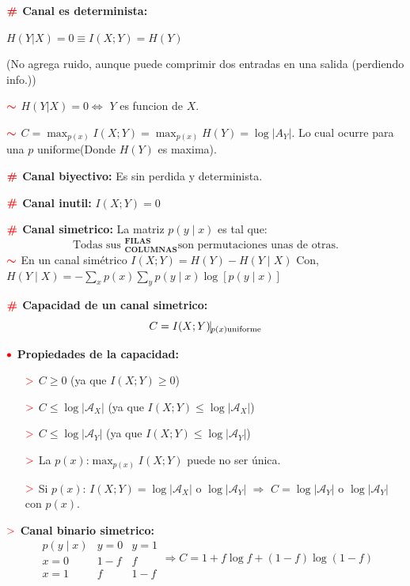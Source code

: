 \documentclass[%
 reprint,
 amsmath,amssymb,
 aps,
]{revtex4-1}
\begin{document}
\textbf{$\color{red}{\textbf{\#}}$ Canal es determinista:} 

$H(Y|X)=0 \equiv I(X;Y)=H(Y)$ 

(No agrega ruido, aunque puede comprimir dos entradas en una salida (perdiendo info.))

\textbf{$\textcolor{red}{\color{red}{\boldsymbol{\sim}}}$} 
$H(Y|X)=0 \Leftrightarrow$ $Y$ es funcion de $X$.
 
\textbf{$\textcolor{red}{\color{red}{\boldsymbol{\sim}}}$} 
$C =\operatorname{max}_{p(x)} I(X ; Y)= \operatorname{max}_{p(x)}H(Y)=\log|A_Y|$. Lo cual ocurre para una $p$ uniforme(Donde $H(Y)$ es maxima).

\textbf{$\color{red}{\textbf{\#}}$ Canal biyectivo:} 
Es sin perdida y determinista.

\textbf{$\color{red}{\textbf{\#}}$ Canal inutil:} 
$I(X ; Y)=0$

\textbf{$\color{red}{\textbf{\#}}$ Canal simetrico:} 
La matriz $p(y \mid x)$ es tal que:
$$
\text{Todas sus } ^\textbf{FILAS}_\textbf{COLUMNAS} \text{son permutaciones unas de otras.}
$$
$\textcolor{red}{\color{red}{\boldsymbol{\sim}}}$ En un canal simétrico $
  I(X ; Y)=H(Y)-H(Y \mid X)
  $
  Con, $
  H(Y \mid X)=-\sum_{x} p(x) \sum_{y} p(y \mid x) \log [p(y \mid x)]
  $

\textbf{$\color{red}{\textbf{\#}}$ Capacidad de un canal simetrico:} 
$$C=I(X;Y)\vline_{p(x)\text{uniforme}}$$

\textbf{$\color{red}{\bullet}$ Propiedades de la capacidad:}
\begin{enumerate}
  \item[$\textcolor{red}{\mathbf{>}}$] $C \geq 0$ (ya que $I(X ; Y) \geq 0$)
  \item[$\textcolor{red}{\mathbf{>}}$] $C \leq \log \left|\mathcal{A}_{X}\right|$ (ya que $I(X ; Y) \leq \log \left|\mathcal{A}_{X}\right|$)
  \item[$\textcolor{red}{\mathbf{>}}$] $C \leq \log \left|\mathcal{A}_{Y}\right|$ (ya que $I(X ; Y) \leq \log \left|\mathcal{A}_{Y}\right|$)
  \item[$\textcolor{red}{\mathbf{>}}$] La $p(x)$:$\operatorname{max}_{p(x)} I(X ; Y)$  puede no ser única.
  \item[$\textcolor{red}{\mathbf{>}}$] Si $p(x)$: $I(X ; Y)=\log \left|\mathcal{A}_{X}\right|$ o $\log \left|\mathcal{A}_{Y}\right|$ $\Rightarrow$ $C=\log \left|\mathcal{A}_{Y}\right|$ o $\log \left|\mathcal{A}_{Y}\right|$ con $p(x)$.
\end{enumerate}


\textbf{$\textcolor{red}{\mathbf{>}}$ Canal binario simetrico:}
$$
\begin{array}{c|cc}
p(y \mid x) & y=0 & y=1 \\
\hline x=0 & 1-f & f \\
x=1 & f & 1-f
\end{array}
\Rightarrow
C=1+f \log f+(1-f) \log (1-f)
$$
\end{document}
